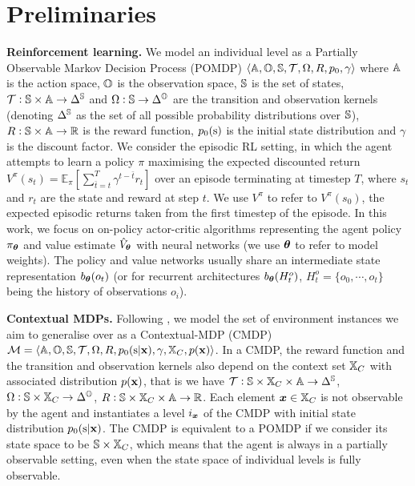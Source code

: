 \documentclass{article}
\theoremstyle{plain}
\theoremstyle{definition}
\theoremstyle{remark}
\begin{document}
\section{Preliminaries}\label{sec:bg}
\textbf{Reinforcement learning.} We model an individual level as a Partially Observable Markov Decision Process (POMDP) $\langle {\mathbb{A}}, {\mathbb{O}}, {\mathbb{S}}, \mathcal{T}, \Omega, R, p_0, \gamma \rangle$ where ${\mathbb{A}}$ is the action space, ${\mathbb{O}}$ is the observation space, ${\mathbb{S}}$ is the set of states, $\mathcal{T} : {\mathbb{S}} \times {\mathbb{A}} \rightarrow \Delta^{\mathbb{S}}$ and $\Omega: {\mathbb{S}} \rightarrow \Delta^{\mathbb{O}}$ are the transition and observation kernels (denoting $\Delta^{\mathbb{S}}$ as the set of all possible probability distributions over ${\mathbb{S}}$), $R:{\mathbb{S}}\times {\mathbb{A}}\rightarrow {\mathbb{R}}$ is the reward function, $p_0({\textnormal{s}})$ is the initial state distribution and $\gamma$ is the discount factor. We consider the episodic RL setting, in which the agent attempts to learn a policy $\pi$ maximising the expected discounted return $V^\pi (s_t) = \mathbb{E}_\pi[\sum^T_{\bar{t}=t}\gamma^{t - \bar{t}} r_t]$ over an episode terminating at timestep $T$, where $s_t$ and $r_t$ are the state and reward at step $t$. We use $V^\pi$ to refer to $V^\pi (s_0)$, the expected episodic returns taken from the first timestep of the episode. In this work, we focus on on-policy actor-critic algorithms \citep{A3C,DDPG,PPO} representing the agent policy $\pi_{\bm{\theta}}$ and value estimate $\hat{V}_{\bm{\theta}}$ with neural networks (we use ${\bm{\theta}}$ to refer to model weights). The policy and value networks usually share an intermediate state representation $b_{\bm{\theta}}(o_t)$ (or for recurrent architectures $b_{\bm{\theta}}(H^o_t)$, $H^o_t = \{o_0,\cdots,o_t\}$ being the history of observations $o_i$).

\textbf{Contextual MDPs.} Following \citet{kirk2023survey}, we model the set of environment instances we aim to generalise over as a Contextual-MDP (CMDP) $\mathcal{M} = \langle {\mathbb{A}}, {\mathbb{O}}, {\mathbb{S}}, \mathcal{T}, \Omega, R,  p_0({\textnormal{s}}|{\mathbf{x}}), \gamma, {\mathbb{X}}_C, p({\mathbf{x}})\rangle$. In a CMDP, the reward function and the transition and observation kernels also depend on the context set ${\mathbb{X}}_C$ with associated distribution $p({\mathbf{x}})$, that is we have $\mathcal{T} : {\mathbb{S}} \times {\mathbb{X}}_C \times {\mathbb{A}} \rightarrow \Delta^{\mathbb{S}}$, $\Omega: {\mathbb{S}} \times {\mathbb{X}}_C \rightarrow \Delta^{\mathbb{O}}$, $R:{\mathbb{S}} \times {\mathbb{X}}_C \times {\mathbb{A}} \rightarrow {\mathbb{R}}$. Each element ${\bm{x}} \in {\mathbb{X}}_C$ is not observable by the agent and instantiates a level $i_{\bm{x}}$ of the CMDP with initial state distribution $p_0({\textnormal{s}}|{\mathbf{x}})$. The CMDP is equivalent to a POMDP if we consider its state space to be ${\mathbb{S}} \times {\mathbb{X}}_C$, which means that the agent is always in a partially observable setting, even when the state space of individual levels is fully observable. 
\end{document}
